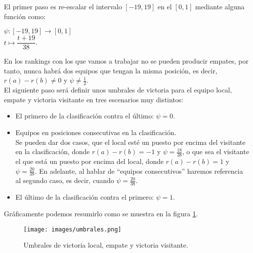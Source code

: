 El primer paso es re-escalar el intervalo $[-19,19]$ en el $[0,1]$ mediante alguna función como:
\begin{center}
	$ \psi: [-19,19] \longrightarrow [0,1]$\\
	$ t \longmapsto \dfrac{t+19}{38}$.
\end{center}

En los rankings con los que vamos a trabajar no se pueden producir empates, por tanto, nunca habrá dos equipos que tengan la misma posición, es decir, $r(a)-r(b)\neq 0$ y $\psi \neq \frac{1}{2}$.\\

El siguiente paso será definir unos umbrales de victoria para el equipo local, empate y victoria visitante en tres escenarios muy distintos:
\begin{itemize}
	\item El primero de la clasificación contra el último: $\psi = 0$.
	\item Equipos en posiciones consecutivas en la clasificación. \\
	Se pueden dar dos casos, que el local esté un puesto por encima del visitante en la clasificación, donde $r(a)-r(b) = -1$ y $\psi = \frac{18}{38}$, o que sea el visitante el que está un puesto por encima del local, donde $r(a)-r(b)=1$ y $\psi = \frac{20}{38}$. En adelante, al hablar de ``equipos consecutivos'' haremos referencia al segundo caso, es decir, cuando $\psi=\frac{20}{38}$.
	\item El último de la clasificación contra el primero: $\psi = 1$.
\end{itemize}

Gráficamente podemos resumirlo como se muestra en la figura \ref{fig:umbrales}.

\begin{figure}[H]
		\centering
		\texttt{[image: images/umbrales.png]}
		\caption{Umbrales de victoria local, empate y victoria visitante.} \label{fig:umbrales}
\end{figure}

